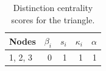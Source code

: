 \begin{table}
\centering
\caption{\label{tab:triangle}Distinction centrality scores for the triangle.}
\centering
\begin{tabular}[t]{lrrrr}
\toprule
Nodes & $\beta_i$ & $s_i$ & $\kappa_i$ & $\alpha$\\
\midrule
1, 2, 3 & 0 & 1 & 1 & 1\\
\bottomrule
\end{tabular}
\end{table}
